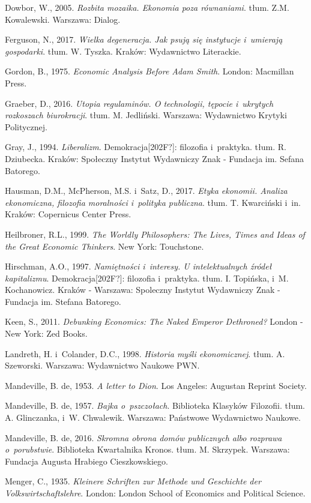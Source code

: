 Dowbor, W., 2005. \textit{Rozbita mozaika. Ekonomia poza równaniami}. tłum. Z.M. Kowalewski. Warszawa: Dialog.

Ferguson, N., 2017. \textit{Wielka degeneracja. Jak psują się instytucje i~umierają gospodarki}. tłum. W. Tyszka. Kraków: Wydawnictwo Literackie.

Gordon, B., 1975. \textit{Economic Analysis Before Adam Smith}. London: Macmillan Press.

Graeber, D., 2016. \textit{Utopia regulaminów. O technologii, tępocie i~ukrytych rozkoszach biurokracji}. tłum. M. Jedliński. Warszawa: Wydawnictwo Krytyki Politycznej.

Gray, J., 1994. \textit{Liberalizm}. Demokracja[202F?]: filozofia i~praktyka. tłum. R. Dziubecka. Kraków: Społeczny Instytut Wydawniczy Znak - Fundacja im. Sefana Batorego.

Hausman, D.M., McPherson, M.S. i~Satz, D., 2017. \textit{Etyka ekonomii. Analiza ekonomiczna, filozofia moralności i~polityka publiczna}. tłum. T. Kwarciński i~in. Kraków: Copernicus Center Press.

Heilbroner, R.L., 1999. \textit{The Worldly Philosophers: The Lives, Times and Ideas of the Great Economic Thinkers}. New York: Touchstone.

Hirschman, A.O., 1997. \textit{Namiętności i~interesy. U intelektualnych źródeł kapitalizmu}. Demokracja[202F?]: filozofia i~praktyka. tłum. I. Topińska, i~M. Kochanowicz. Kraków - Warszawa: Spoleczny Instytut Wydawniczy Znak - Fundacja im. Stefana Batorego.

Keen, S., 2011. \textit{Debunking Economics: The Naked Emperor Dethroned?} London - New York: Zed Books.

Landreth, H. i~Colander, D.C., 1998. \textit{Historia myśli ekonomicznej}. tłum. A. Szeworski. Warszawa: Wydawnictwo Naukowe PWN.

Mandeville, B. de, 1953. \textit{A letter to Dion}. Los Angeles: Augustan Reprint Society.

Mandeville, B. de, 1957. \textit{Bajka o~pszczołach}. Biblioteka Klasyków Filozofii. tłum. A. Glinczanka, i~W. Chwalewik. Warszawa: Państwowe Wydawnictwo Naukowe.

Mandeville, B. de, 2016. \textit{Skromna obrona domów publicznych albo rozprawa o~porubstwie}. Biblioteka Kwartalnika Kronos. tłum. M. Skrzypek. Warszawa: Fundacja Augusta Hrabiego Cieszkowskiego.

Menger, C., 1935. \textit{Kleinere Schriften zur Methode und Geschichte der Volkswirtschaftslehre}. London: London School of Economics and Political Science.


